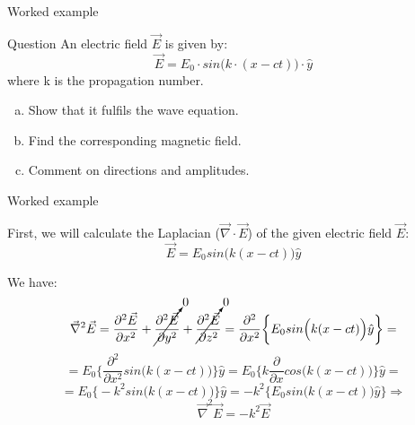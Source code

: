 %
%

{
\problemslide

%
%
%
%

\begin{frame}{Worked example}

\begin{blockexmplque}{Question}
An electric field $\vec{E}$ is given by:
\begin{equation*}
  \vec{E} = E_{0} \cdot sin\Big(k \cdot  (x-ct)\Big) \cdot \hat{y}
\end{equation*}
where k is the propagation number.\\
\vspace{0.3cm}
\begin{enumerate}[(a)]
 \item Show that it fulfils the wave equation.
 \item Find the corresponding magnetic field.
 \item Comment on directions and amplitudes.
\end{enumerate}
\end{blockexmplque}

\end{frame}

%
%
%
%

\begin{frame}{Worked example}

First, we will calculate the Laplacian ($\vec{\nabla} \cdot \vec{E}$)
of the given electric field $\vec{E}$:
\begin{equation*}
  \vec{E} = E_{0} sin\Big(k(x-ct)\Big) \hat{y}
\end{equation*}

We have:
\begin{equation*}
  \vec{\nabla}^{2} \vec{E} =
  \frac{\partial^{2} \vec{E}} {\partial x^{2}} +
  \cancelto{0}{\frac{\partial^{2} \vec{E}} {\partial y^{2}}} +
  \cancelto{0}{\frac{\partial^{2} \vec{E}} {\partial z^{2}}} =
  \frac{\partial^{2}} {\partial x^{2}} \bigg\{ E_{0} sin\Big(k(x-ct)\Big) \hat{y} \bigg\} =
\end{equation*}
\begin{equation*}
     = E_{0} \bigg\{ \frac{\partial^{2}} {\partial x^{2}} sin\Big(k(x-ct)\Big) \bigg\} \hat{y} =
        E_{0} \bigg\{ k \frac{\partial} {\partial x} cos\Big(k(x-ct)\Big) \bigg\} \hat{y} =
\end{equation*}
\begin{equation*}
     = E_{0} \bigg\{ - k^2 sin\Big(k(x-ct)\Big) \bigg\} \hat{y} =
      - k^2 \bigg\{ E_{0} sin\Big(k(x-ct)\Big) \hat{y} \bigg\} \Rightarrow
\end{equation*}
\begin{equation*}
  \vec{\nabla}^{2} \vec{E} = - k^2 \vec{E}
\end{equation*}


\end{frame}}

